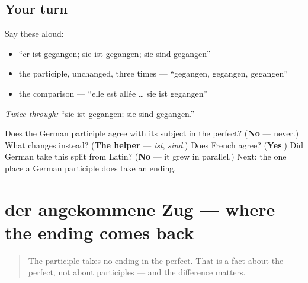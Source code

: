 \subsection*{Your turn}
Say these aloud:

\begin{itemize}
\raggedright
  \item \textquotedblleft{}er ist gegangen; sie ist gegangen; sie sind gegangen\textquotedblright{}
  \item the participle, unchanged, three times — \textquotedblleft{}gegangen, gegangen, gegangen\textquotedblright{}
  \item the comparison — \textquotedblleft{}elle est allée … sie ist gegangen\textquotedblright{}
\end{itemize}

\emph{Twice through:} \textquotedblleft{}sie ist gegangen; sie sind gegangen.\textquotedblright{}

\begin{tcolorbox}[breakable,colback=teal!4,colframe=teal!35!black,title={Before you move on}]
Does the German participle agree with its subject in the perfect? (\textbf{No} — never.) What changes instead? (\textbf{The helper} — \emph{ist}, \emph{sind}.) Does French agree? (\textbf{Yes}.) Did German take this split from Latin? (\textbf{No} — it grew in parallel.) Next: the one place a German participle does take an ending.
\end{tcolorbox}
\section[der angekommene Zug]{der angekommene Zug — where the ending comes back}

\label{lesson:GE-C16-partizip-attributiv}



\begin{quote}
The participle takes no ending in the perfect. That is a fact about the perfect, not about participles — and the difference matters.
\end{quote}

